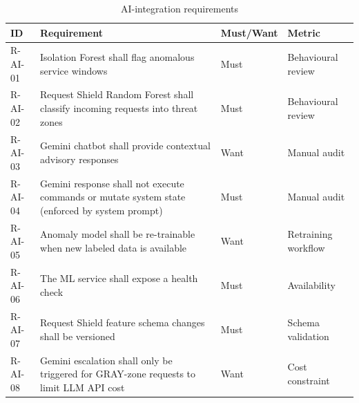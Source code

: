 \begin{table}[H]
\centering
\caption{AI-integration requirements}\label{tab:airec}
\begin{tabularx}{\textwidth}{@{}l X l l@{}}
\toprule
\textbf{ID} & \textbf{Requirement} & \textbf{Must/Want} & \textbf{Metric}\\
\midrule
R-AI-01 & Isolation Forest shall flag anomalous service windows &
  Must & Behavioural review\\
R-AI-02 & Request Shield Random Forest shall classify incoming requests into threat zones &
  Must & Behavioural review\\
R-AI-03 & Gemini chatbot shall provide contextual advisory responses &
  Want & Manual audit\\
R-AI-04 & Gemini response shall not execute commands or mutate system state
  (enforced by system prompt) & Must & Manual audit\\
R-AI-05 & Anomaly model shall be re-trainable when new labeled data is available &
  Want & Retraining workflow\\
R-AI-06 & The ML service shall expose a health check & Must & Availability\\
R-AI-07 & Request Shield feature schema changes shall be versioned & Must & Schema validation\\
R-AI-08 & Gemini escalation shall only be triggered for GRAY-zone requests
  to limit LLM API cost & Want & Cost constraint\\
\bottomrule
\end{tabularx}
\end{table}

